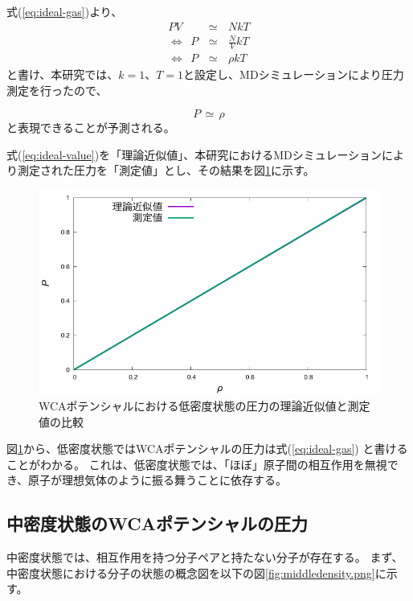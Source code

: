 \documentclass[titlepage]{jsreport}
\begin{document}
{{{式(\ref{eq:ideal-gas})より、
\large
\begin{eqnarray}
PV\,&{\simeq}&\,NkT\nonumber\\
{\Leftrightarrow}{\ }{\ }P\,&{\simeq}&\,{\frac{N}{V}}kT\nonumber\\
{\Leftrightarrow}{\ }{\ }P\,&{\simeq}&\,{\rho}kT\nonumber
\end{eqnarray}
\normalsize
と書け、本研究では、$k=1$、$T=1$と設定し、MDシミュレーションにより圧力測定を行ったので、

\large
\begin{equation}
P\,{\simeq}\,{\rho} \label{eq:ideal-value}
\end{equation}
\normalsize
と表現できることが予測される。

式(\ref{eq:ideal-value})を「理論近似値」、本研究におけるMDシミュレーションにより測定された圧力を「測定値」とし、その結果を図\ref{fig:lowden_compare:den-pre}に示す。

\begin{figure}[htbp]
    \begin{center}
        \includegraphics[width=14cm]{fig/lowden_compare:den-pre.pdf}
    \end{center}
    \caption{WCAポテンシャルにおける低密度状態の圧力の理論近似値と測定値の比較}
    \label{fig:lowden_compare:den-pre}
\end{figure}

図\ref{fig:lowden_compare:den-pre}から、低密度状態ではWCAポテンシャルの圧力は式(\ref{eq:ideal-gas})
と書けることがわかる。
これは、低密度状態では、「ほぼ」原子間の相互作用を無視でき、原子が理想気体のように振る舞うことに依存する。


\subsection{中密度状態のWCAポテンシャルの圧力}\label{results-subsec:WCA-press-middle-density}
中密度状態では、相互作用を持つ分子ペアと持たない分子が存在する。
まず、中密度状態における分子の状態の概念図を以下の図\ref{fig:middledensity.png}に示す。

}}}
\end{document}
